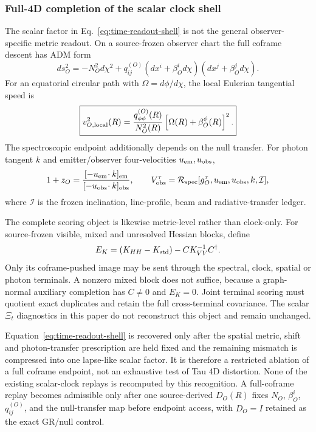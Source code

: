 \documentclass[11pt]{article}
\begin{document}
\subsubsection{Full-4D completion of the scalar clock shell}

The scalar factor in Eq.~\eqref{eq:time-readout-shell} is not the general
observer-specific metric readout.  On a source-frozen observer chart the full
coframe descent has ADM form
\begin{equation}
 ds_O^2=-N_O^2d\chi^2
 +q_{ij}^{(O)}(dx^i+\beta_O^i d\chi)
                 (dx^j+\beta_O^j d\chi).
 \label{eq:full-4d-adm-readout}
\end{equation}
For an equatorial circular path with \(\Omega=d\phi/d\chi\), the local
Eulerian tangential speed is
\begin{equation}
 \boxed{
 v_{O,{\rm local}}^2(R)
 =
 \frac{q_{\phi\phi}^{(O)}(R)}{N_O^2(R)}
 \left[\Omega(R)+\beta_O^\phi(R)\right]^2 .}
 \label{eq:full-4d-local-speed}
\end{equation}
The spectroscopic endpoint additionally depends on the null transfer.  For
photon tangent \(k\) and emitter/observer four-velocities
\(u_{\rm em},u_{\rm obs}\),
\begin{equation}
 1+z_O=\frac{[-u_{\rm em}\!\cdot k]_{\rm em}}{[-u_{\rm obs}\!\cdot k]_{\rm obs}},
 \qquad
 V_{\rm obs}^\tau
 =\mathcal R_{\rm spec}
  [g_O^\tau,u_{\rm em},u_{\rm obs},k,\mathcal I],
 \label{eq:full-4d-spectral-readout}
\end{equation}
where \(\mathcal I\) is the frozen inclination, line-profile, beam and
radiative-transfer ledger.

The complete scoring object is likewise metric-level rather than clock-only.
For source-frozen visible, mixed and unresolved Hessian blocks, define
\[
 E_K=(K_{HH}-K_{\rm std})-CK_{VV}^{-1}C^\dagger.
\]
Only its coframe-pushed image may be sent through the spectral, clock, spatial
or photon terminals.  A nonzero mixed block does not suffice, because a
graph-normal auxiliary completion has \(C\neq0\) and \(E_K=0\).  Joint
terminal scoring must quotient exact duplicates and retain the full
cross-terminal covariance.  The scalar \(\Xi_t\) diagnostics in this paper do
not reconstruct this object and remain unchanged.

Equation~\eqref{eq:time-readout-shell} is recovered only after the spatial
metric, shift and photon-transfer prescription are held fixed and the
remaining mismatch is compressed into one lapse-like scalar factor.  It is
therefore a restricted ablation of a full coframe endpoint, not an exhaustive
test of Tau 4D distortion.  None of the existing scalar-clock replays is
recomputed by this recognition.  A full-coframe replay becomes admissible only
after one source-derived \(D_O(R)\) fixes \(N_O\), \(\beta_O^i\),
\(q_{ij}^{(O)}\), and the null-transfer map before endpoint access, with
\(D_O=I\) retained as the exact GR/null control.
\end{document}
